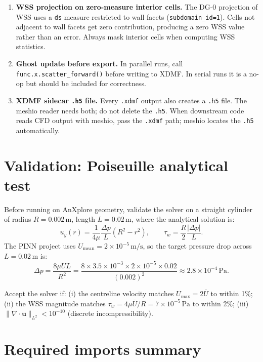 \documentclass[11pt]{article}
\begin{document}
\begin{enumerate}[noitemsep]
\item \textbf{WSS projection on zero-measure interior cells.}
  The DG-0 projection of WSS uses a \texttt{ds} measure restricted to
  wall facets (\texttt{subdomain\_id=1}). Cells not adjacent to wall
  facets get zero contribution, producing a zero WSS value rather than
  an error. Always mask interior cells when computing WSS statistics.

\item \textbf{Ghost update before export.}
  In parallel runs, call \texttt{func.x.scatter\_forward()} before
  writing to XDMF. In serial runs it is a no-op but should be included
  for correctness.

\item \textbf{XDMF sidecar \texttt{.h5} file.}
  Every \texttt{.xdmf} output also creates a \texttt{.h5} file. The
  meshio reader needs both; do not delete the \texttt{.h5}. When
  downstream code reads CFD output with meshio, pass the \texttt{.xdmf}
  path; meshio locates the \texttt{.h5} automatically.

\end{enumerate}

\section{Validation: Poiseuille analytical test}

Before running on AnXplore geometry, validate the solver on a straight
cylinder of radius $R=0.002\,\text{m}$, length $L=0.02\,\text{m}$,
where the analytical solution is:
\[
  u_y(r) = \frac{1}{4\mu}\frac{\Delta p}{L}(R^2 - r^2),
  \qquad
  \tau_w = \frac{R}{2}\frac{|\Delta p|}{L}.
\]
The PINN project uses $U_{\text{mean}} = 2\times10^{-5}\,\text{m/s}$, so
the target pressure drop across $L=0.02\,\text{m}$ is:
\[
  \Delta p = \frac{8\mu\bar{U}L}{R^2}
  = \frac{8 \times 3.5\times10^{-3} \times 2\times10^{-5} \times 0.02}{(0.002)^2}
  \approx 2.8\times10^{-4}\,\text{Pa}.
\]

Accept the solver if: (i) the centreline velocity matches $U_{\max} = 2\bar{U}$
to within 1\%; (ii) the WSS magnitude matches $\tau_w = 4\mu\bar{U}/R =
7\times10^{-5}\,\text{Pa}$ to within 2\%; (iii) $\|\nabla\cdot\mathbf{u}\|_{L^2}
< 10^{-10}$ (discrete incompressibility).

\section{Required imports summary}
\end{document}
